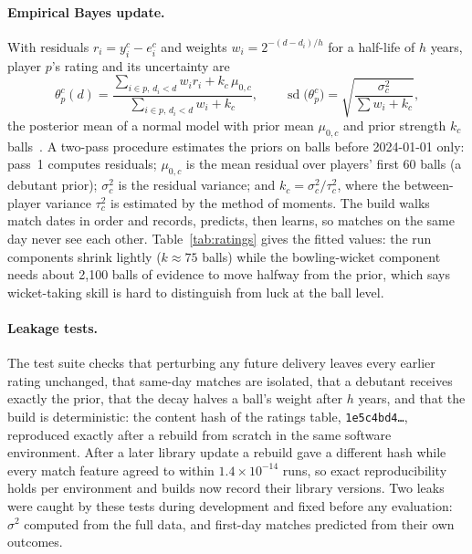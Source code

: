 \documentclass[11pt]{article}
\newcommand{\code}[1]{\texttt{#1}}
\begin{document}
\paragraph{Empirical Bayes update.} With residuals $r_i=y_i^c-e_i^c$ and weights
$w_i=2^{-(d-d_i)/h}$ for a half-life of $h$ years, player $p$'s rating and its uncertainty are
\begin{equation}
  \theta^c_p(d) = \frac{\sum_{i\in p,\,d_i<d} w_i r_i + k_c\,\mu_{0,c}}{\sum_{i\in p,\,d_i<d} w_i + k_c},
  \qquad
  \operatorname{sd}\bigl(\theta^c_p\bigr)=\sqrt{\frac{\sigma_c^2}{\sum w_i + k_c}},
\end{equation}
the posterior mean of a normal model with prior mean $\mu_{0,c}$ and prior strength $k_c$
balls~\citep{efronmorris1975}. A two-pass procedure estimates the priors on balls before 2024-01-01 only:
pass~1 computes residuals; $\mu_{0,c}$ is the mean residual over players' first 60 balls (a debutant prior);
$\sigma_c^2$ is the residual variance; and $k_c=\sigma_c^2/\tau_c^2$, where the between-player variance
$\tau_c^2$ is estimated by the method of moments. The build walks match dates in order and
records, predicts, then learns, so matches on the same day never see each other. Table~\ref{tab:ratings}
gives the fitted values: the run components shrink lightly ($k\approx 75$ balls) while the bowling-wicket
component needs about 2{,}100 balls of evidence to move halfway from the prior, which says wicket-taking
skill is hard to distinguish from luck at the ball level.



\paragraph{Leakage tests.} The test suite checks that perturbing any future delivery leaves every earlier
rating unchanged, that same-day matches are isolated, that a debutant receives exactly the prior, that the
decay halves a ball's weight after $h$ years, and that the build is deterministic: the content hash of the
ratings table, \code{1e5c4bd4\ldots}, reproduced exactly after a rebuild from scratch in the same software
environment. After a later library update a rebuild gave a different hash while every match feature agreed to
within $1.4\times10^{-14}$ runs, so exact reproducibility holds per environment and builds now record their
library versions. Two leaks were caught
by these tests during development and fixed before any evaluation: $\sigma^2$ computed from the full data,
and first-day matches predicted from their own outcomes.
\end{document}
